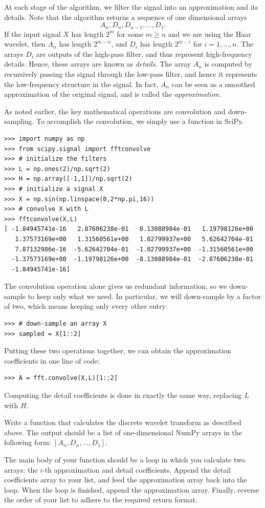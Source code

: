 At each stage of the algorithm, we filter the signal into an approximation and its details.
Note that the algorithm returns a sequence of one dimensional arrays
\[A_n, D_n, D_{n-1}, \ldots, D_1.\]
If the input signal $X$ has length $2^m$ for
some $m \geq n$ and we are using the Haar wavelet, then $A_n$ has length $2^{m-n}$, and $D_i$ has length $2^{m-i}$
for $i=1,\ldots,n$. The arrays $D_i$ are outputs of the high-pass filter, and thus represent high-frequency
details.
Hence, these arrays are known as \emph{details}.
The array $A_n$ is computed by recursively passing the signal through the low-pass filter, and hence it
represents the low-frequency structure in the signal.
In fact, $A_n$ can be seen as a smoothed approximation of the original signal, and is called the \emph{approximation}.

As noted earlier, the key mathematical operations are convolution and down-sampling.
To accomplish the convolution, we simply use a function in SciPy.
\begin{lstlisting}
>>> import numpy as np
>>> from scipy.signal import fftconvolve
>>> # initialize the filters
>>> L = np.ones(2)/np.sqrt(2)
>>> H = np.array([-1,1])/np.sqrt(2)
>>> # initialize a signal X
>>> X = np.sin(np.linspace(0,2*np.pi,16))
>>> # convolve X with L
>>> fftconvolve(X,L)
[ -1.84945741e-16   2.87606238e-01   8.13088984e-01   1.19798126e+00
   1.37573169e+00   1.31560561e+00   1.02799937e+00   5.62642704e-01
   7.87132986e-16  -5.62642704e-01  -1.02799937e+00  -1.31560561e+00
  -1.37573169e+00  -1.19798126e+00  -8.13088984e-01  -2.87606238e-01
  -1.84945741e-16]
\end{lstlisting}
The convolution operation alone gives us redundant information, so we down-sample to keep only what we need.
In particular, we will down-sample by a factor
of two, which means keeping only every other entry:
\begin{lstlisting}
>>> # down-sample an array X
>>> sampled = X[1::2]
\end{lstlisting}
Putting these two operations together, we can obtain the approximation coefficients in one
line of code:
\begin{lstlisting}
>>> A = fft.convolve(X,L)[1::2]
\end{lstlisting}
Computing the detail coefficients is done in exactly the same way, replacing $L$ with $H$.
\begin{problem}
Write a function that calculates the discrete wavelet transform as described above.
The output should be a list of one-dimensional NumPy arrays in the
following form: $[A_n, D_n, \ldots, D_1]$.

The main body of your function should be a loop in which you calculate two arrays: the $i$-th approximation
and detail coefficients. Append the detail coefficients array to your list, and feed the approximation array
back into the loop. When the loop is finished, append the approximation array. Finally, reverse the order of your list
to adhere to the required return format.
\end{problem}
